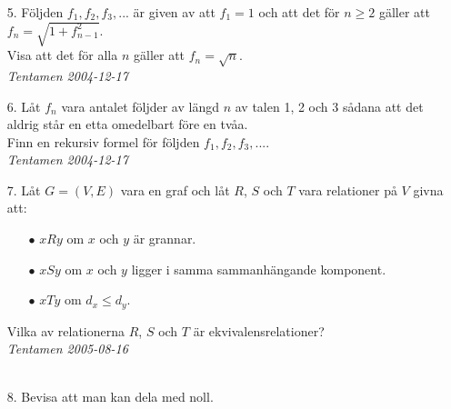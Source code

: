 \documentclass{article}
\begin{document}
\begin{enumerate}
{\it Tentamen 2005-01-11}\\
\\
\item[5.]
    Följden $f_1, f_2, f_3,...$ är given av att $f_1=1$ och att det för $n \ge 
    2$ gäller att $f_n = \sqrt{1+f^2_{n-1}}$.\\
    Visa att det för alla $n$ gäller att $f_n = \sqrt{n}$.\\
{\it Tentamen 2004-12-17}\\

\item[6.]
    Låt $f_n$ vara antalet följder av längd $n$ av talen 1, 2 och 3 sådana att 
    det aldrig står en etta omedelbart före en tvåa.\\
    Finn en rekursiv formel för följden $f_1, f_2, f_3,...$.\\
{\it Tentamen 2004-12-17}\\

\item[7.]
    Låt $G=(V,E)$ vara en graf och låt $R$, $S$ och $T$ vara relationer på $V$ 
    givna att:
    \begin{itemize}
        \item[$\bullet$] $xRy$ om $x$ och $y$ är grannar.
        \item[$\bullet$] $xSy$ om $x$ och $y$ ligger i samma sammanhängande 
                       komponent.
        \item[$\bullet$] $xTy$ om $d_{x} \leq d_{y}$.
    \end{itemize}
    Vilka av relationerna $R$, $S$ och $T$ är ekvivalensrelationer?\\
{\it Tentamen 2005-08-16}\\
\\
\item[8.]
    Bevisa att man kan dela med noll.


\end{enumerate}
\end{document}
